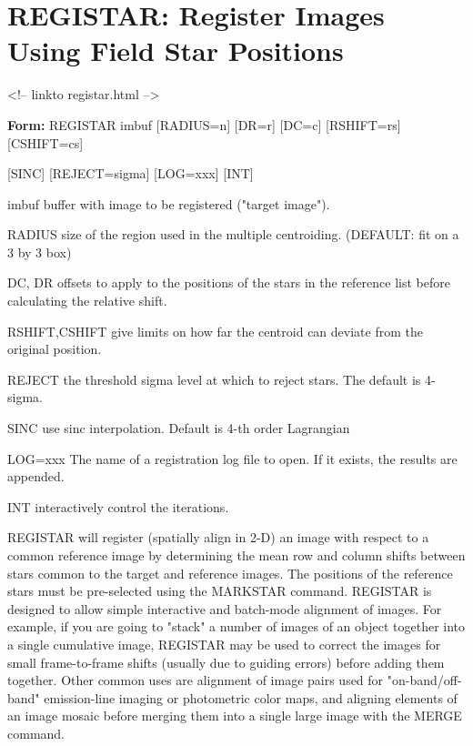 \section{REGISTAR: Register Images Using Field Star Positions}
\begin{rawhtml}
<!-- linkto registar.html -->
\end{rawhtml}

\begin{command}
  \item[\textbf{Form: } REGISTAR imbuf {[RADIUS=n]} {[DR=r]} {[DC=c]} 
       {[RSHIFT=rs]} {[CSHIFT=cs]}\hfill]{}
       \item{{[SINC]} {[REJECT=sigma]} {[LOG=xxx]} {[INT]}}
  \item[imbuf]{buffer with image to be registered ("target image").}
  \item[RADIUS]{size of the region used in the multiple centroiding.
       (DEFAULT: fit on a 3 by 3 box)}
  \item[DC, DR]{offsets to apply to the positions of the stars in the
       reference list before calculating the relative shift.}
  \item[RSHIFT,CSHIFT]{give limits on how far the centroid can deviate 
       from the original position.}
  \item[REJECT]{the threshold sigma level at which to reject stars. The
       default is 4-sigma.}
  \item[SINC]{use sinc interpolation. Default is 4-th order Lagrangian}
  \item[LOG=xxx]{The name of a registration log file to open.  If it exists,
       the results are appended.  }
  \item[INT]{interactively control the iterations.}
\end{command}

REGISTAR will register (spatially align in 2-D) an image with respect to a
common reference image by determining the mean row and column shifts
between stars common to the target and reference images.  The positions of
the reference stars must be pre-selected using the MARKSTAR command.
REGISTAR is designed to allow simple interactive and batch-mode alignment
of images.  For example, if you are going to "stack" a number of images of
an object together into a single cumulative image, REGISTAR may be used to
correct the images for small frame-to-frame shifts (usually due to guiding
errors) before adding them together.  Other common uses are alignment of
image pairs used for "on-band/off-band" emission-line imaging or
photometric color maps, and aligning elements of an image mosaic before
merging them into a single large image with the MERGE command.

